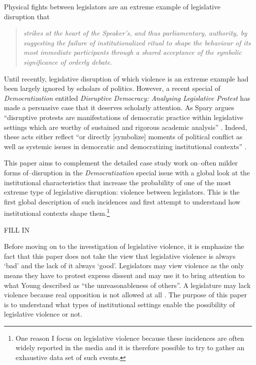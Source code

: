 \documentclass[a4paper]{article}\usepackage{graphicx, color}
\begin{document}
Physical fights between legislators are an extreme example of legislative disruption that

\begin{quote}
	\emph{strikes at the heart of the Speaker's, and thus parliamentary, authority, by suggesting the failure of institutionalized ritual to shape the behaviour of its most immediate participants through a shared acceptance of the symbolic significance of orderly debate.} \citep[387]{Rai2013}
\end{quote}

\noindent Until recently, legislative disruption of which violence is an extreme example had been largely ignored by scholars of politics. However, a recent special of \emph{Democratization} \citeyearpar{Democratization2013} entitled \emph{Disruptive Democracy: Analysing Legislative Protest} has made a persuasive case that it deserves scholarly attention. As Spary argues ``disruptive protests are manifestations of democratic practice within legislative settings which are worthy of sustained and rigorous academic analysis'' \citeyearpar[393]{Spary2013}. Indeed, these acts either reflect ``or directly [symbolize] moments of political conflict as well as systemic issues in democratic and democratizing institutional contexts'' \citep[394-395]{Spary2013}.

This paper aims to complement the detailed case study work on--often milder forms of--disruption in the \emph{Democratization} special issue \citep{Armitage2013,Johnson2013,Ilie2013} with a global look at the institutional characteristics that increase the probability of one of the most extreme type of legislative disruption: violence between legislators. This is the first global description of such incidences and first attempt to understand how institutional contexts shape them.\footnote{One reason I focus on legislative violence because these incidences are often widely reported in the media and it is therefore possible to try to gather an exhaustive data set of such events.}

FILL IN

Before moving on to the investigation of legislative violence, it is emphasize the fact that this paper does not take the view that legislative violence is always `bad' and the lack of it always `good'. Legislators may view violence as the only means they have to protest express dissent and may use it to bring attention to what Young \cite[49]{Young2002} described as ``the unreasonableness of others''. A legislature may lack violence because real opposition is not allowed at all \citep[for a discussion in the Russian context see][]{Ostrow1996}. The purpose of this paper is to understand what types of institutional settings enable the possibility of legislative violence or not.



\end{document}
